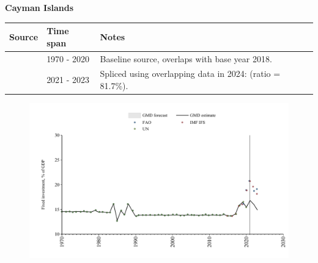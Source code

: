 \documentclass[12pt,a4paper,landscape]{article}
\begin{document}
\begin{adjustbox}{max totalsize={\paperwidth}{\paperheight},center}
\begin{minipage}[t][\textheight][t]{\textwidth}
\vspace*{0.5cm}
{}
\begin{center}
{\Large\bfseries Cayman Islands}
\end{center}
\vspace{0.5cm}
\begin{table}[H]
\centering
\small
\begin{tabular}{|l|l|l|}
\hline
\textbf{Source} & \textbf{Time span} & \textbf{Notes} \\
\hline
\rowcolor{white}\cite{UN}& 1970 - 2020 &Baseline source, overlaps with base year 2018.\\
\rowcolor{lightgray}\cite{IMF_IFS}& 2021 - 2023 &Spliced using overlapping data in 2024: (ratio = 81.7\%).\\
\hline
\end{tabular}
\end{table}
\begin{figure}[H]
\centering
\includegraphics[width=\textwidth,height=0.6\textheight,keepaspectratio]{graphs/CYM_finv_GDP.pdf}
\end{figure}
\end{minipage}
\end{adjustbox}
\end{document}
